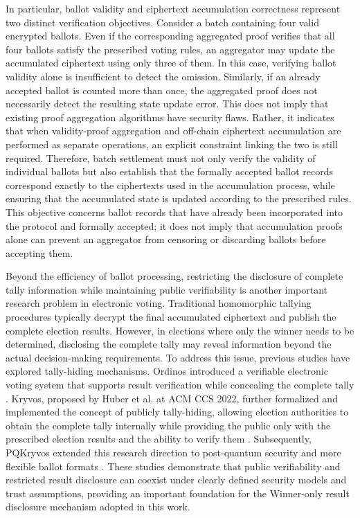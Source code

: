\documentclass[pdflatex,sn-mathphys-num]{sn-jnl}%
\theoremstyle{thmstyleone}%
\theoremstyle{thmstyletwo}%
\theoremstyle{thmstylethree}%
\begin{document}
In particular, ballot validity and ciphertext accumulation correctness represent two
distinct verification objectives. Consider a batch containing four valid encrypted
ballots. Even if the corresponding aggregated proof verifies that all four ballots
satisfy the prescribed voting rules, an aggregator may update the accumulated ciphertext
using only three of them. In this case, verifying ballot validity alone is insufficient
to detect the omission. Similarly, if an already accepted ballot is counted more than
once, the aggregated proof does not necessarily detect the resulting state update error.
This does not imply that existing proof aggregation algorithms have security flaws.
Rather, it indicates that when validity-proof aggregation and off-chain ciphertext
accumulation are performed as separate operations, an explicit constraint linking the
two is still required. Therefore, batch settlement must not only verify the validity of
individual ballots but also establish that the formally accepted ballot records
correspond exactly to the ciphertexts used in the accumulation process, while ensuring
that the accumulated state is updated according to the prescribed rules. This objective
concerns ballot records that have already been incorporated into the protocol and
formally accepted; it does not imply that accumulation proofs alone can prevent an
aggregator from censoring or discarding ballots before accepting them.

Beyond the efficiency of ballot processing, restricting the disclosure of complete tally
information while maintaining public verifiability is another important research problem
in electronic voting. Traditional homomorphic tallying procedures typically decrypt the
final accumulated ciphertext and publish the complete election results. However, in
elections where only the winner needs to be determined, disclosing the complete tally
may reveal information beyond the actual decision-making requirements. To address this
issue, previous studies have explored tally-hiding mechanisms. Ordinos introduced a
verifiable electronic voting system that supports result verification while concealing
the complete tally \cite{bib76}. Kryvos, proposed by Huber et al. at ACM CCS 2022,
further formalized and implemented the concept of publicly tally-hiding, allowing
election authorities to obtain the complete tally internally while providing the public
only with the prescribed election results and the ability to verify them \cite{bib77}.
Subsequently, PQKryvos extended this research direction to post-quantum security and
more flexible ballot formats \cite{bib139}. These studies demonstrate that public
verifiability and restricted result disclosure can coexist under clearly defined
security models and trust assumptions, providing an important foundation for the
Winner-only result disclosure mechanism adopted in this work.
\end{document}
